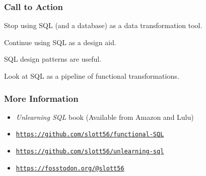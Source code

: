 \documentclass{beamer}
\begin{document}
\begin{frame}
    \frametitle{Call to Action}
    Stop using SQL (and a database) as a data transformation tool.

    \vspace{1em}
    Continue using SQL as a design aid.

    \vspace{1em}
    SQL design patterns are useful.

    \vspace{1em}
    Look at SQL as a pipeline of functional transformations.
\end{frame}

\begin{frame}
    \frametitle{More Information}

    \begin{itemize}
        \item \textit{Unlearning SQL} book (Available from Amazon and Lulu) \vspace{1em}
        \item \texttt{\underline{https://github.com/slott56/functional-SQL}} \vspace{1em}
        \item \texttt{\underline{https://github.com/slott56/unlearning-sql}} \vspace{1em}
        \item \texttt{\underline{https://fosstodon.org/@slott56}}
    \end{itemize}
\end{frame}
\end{document}
